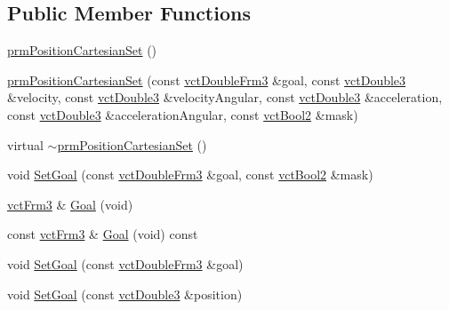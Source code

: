\subsection*{Public Member Functions}
\begin{DoxyCompactItemize}
\item 
\hyperlink{classprm_position_cartesian_set_ab399e9353016dd8acadbcc0329c6fc4b}{prm\-Position\-Cartesian\-Set} ()
\item 
\hyperlink{classprm_position_cartesian_set_a62d1b0125aa0628bb5d6735d589d2e83}{prm\-Position\-Cartesian\-Set} (const \hyperlink{vct_transformation_types_8h_acc33ebdc1b58783aa59508c7b5200b56}{vct\-Double\-Frm3} \&goal, const \hyperlink{vct_fixed_size_vector_types_8h_a4a89122c9d7f72c3f31fe8126e17c3af}{vct\-Double3} \&velocity, const \hyperlink{vct_fixed_size_vector_types_8h_a4a89122c9d7f72c3f31fe8126e17c3af}{vct\-Double3} \&velocity\-Angular, const \hyperlink{vct_fixed_size_vector_types_8h_a4a89122c9d7f72c3f31fe8126e17c3af}{vct\-Double3} \&acceleration, const \hyperlink{vct_fixed_size_vector_types_8h_a4a89122c9d7f72c3f31fe8126e17c3af}{vct\-Double3} \&acceleration\-Angular, const \hyperlink{vct_fixed_size_vector_types_8h_ab49415a9643a1ee037f2a036058caeaa}{vct\-Bool2} \&mask)
\item 
virtual \hyperlink{classprm_position_cartesian_set_aa034f08ad07ae2777f660472f03ce7ca}{$\sim$prm\-Position\-Cartesian\-Set} ()
\item 
void \hyperlink{classprm_position_cartesian_set_a2ae3d0a9167cef13a829338802fb6329}{Set\-Goal} (const \hyperlink{vct_transformation_types_8h_acc33ebdc1b58783aa59508c7b5200b56}{vct\-Double\-Frm3} \&goal, const \hyperlink{vct_fixed_size_vector_types_8h_ab49415a9643a1ee037f2a036058caeaa}{vct\-Bool2} \&mask)
\item 
\hyperlink{vct_transformation_types_8h_a81feda0a02c2d1bc26e5553f409fed20}{vct\-Frm3} \& \hyperlink{classprm_position_cartesian_set_ac4ecda1c96f8d40c18e998cd22488eb8}{Goal} (void)
\item 
const \hyperlink{vct_transformation_types_8h_a81feda0a02c2d1bc26e5553f409fed20}{vct\-Frm3} \& \hyperlink{classprm_position_cartesian_set_a4a76e968da8a130f42c41a06b2eea35b}{Goal} (void) const 
\item 
void \hyperlink{classprm_position_cartesian_set_ab6b21f2c95db085559eb790314f0b5c5}{Set\-Goal} (const \hyperlink{vct_transformation_types_8h_acc33ebdc1b58783aa59508c7b5200b56}{vct\-Double\-Frm3} \&goal)
\item 
void \hyperlink{classprm_position_cartesian_set_ab324983ec5668c66d8ff2fb96687d221}{Set\-Goal} (const \hyperlink{vct_fixed_size_vector_types_8h_a4a89122c9d7f72c3f31fe8126e17c3af}{vct\-Double3} \&position)

\end{DoxyCompactItemize}

